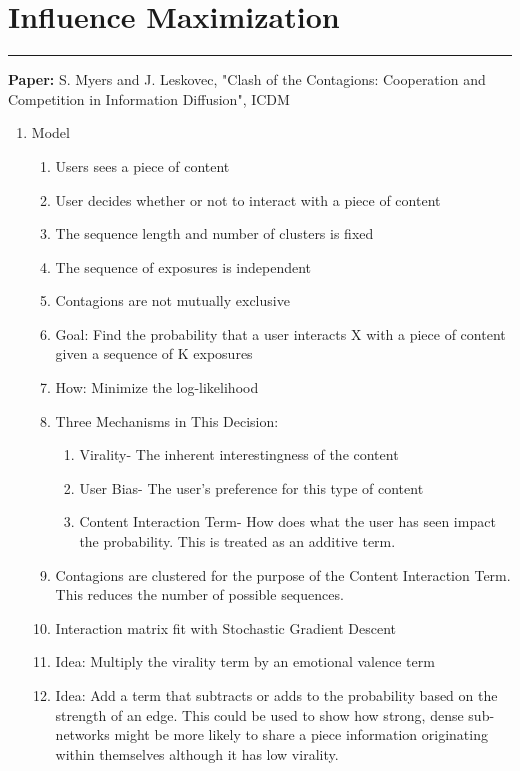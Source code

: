 \documentclass[11pt]{article}
\begin{document}
\smallskip
\section{Influence Maximization}
\noindent
\rule{\textwidth}{0.01in}
\textbf{Paper:} S. Myers and J. Leskovec, "Clash of the Contagions: Cooperation and Competition in Information Diffusion", ICDM
\begin{enumerate}
    \item Model 
    \begin{enumerate}
        \item Users sees a piece of content
        \item User decides whether or not to interact with a piece of content
        \item The sequence length and number of clusters is fixed
        \item The sequence of exposures is independent
        \item Contagions are not mutually exclusive
        \item Goal: Find the probability that a user interacts X with a piece of content given a sequence of K exposures
         \item How: Minimize the log-likelihood
        \item Three Mechanisms in This Decision: 
        \begin{enumerate}
            \item Virality- The inherent interestingness of the content
            \item User Bias- The user's preference for this type of content
            \item Content Interaction Term- How does what the user has seen impact the probability. This is treated as an additive term.
        \end{enumerate}
        \item Contagions are clustered for the purpose of the Content Interaction Term. This reduces the number of possible sequences.
        \item Interaction matrix fit with Stochastic Gradient Descent
        \item Idea: Multiply the virality term by an emotional valence term 
        \item Idea: Add a term that subtracts or adds to the probability based on the strength of an edge. This could be used to show how strong, dense sub-networks might be more likely to share a piece information originating within themselves although it has low virality.

\end{enumerate}
\end{enumerate}
\end{document}
